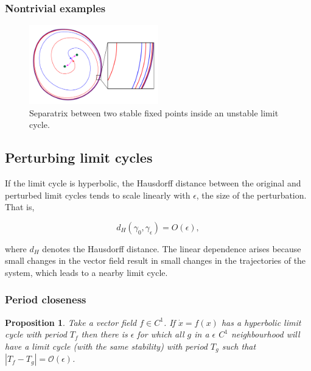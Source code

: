 \documentclass{article}
\newtheorem{proposition}{Proposition}
\theoremstyle{definition}
\theoremstyle{remark}
\newcounter{ct}
\begin{document}
\subsubsection{Nontrivial examples}

\setlength\belowcaptionskip{-5ex}
\begin{figure}
  \centering
  \includegraphics[width=0.5\textwidth]{unstab_lc_3fps}
  \caption{Separatrix between two stable fixed points inside an unstable limit cycle.
  }\label{fig:unstab_lc_3fps}
\end{figure}



\subsection{Perturbing limit cycles}
If the limit cycle is hyperbolic, the Hausdorff distance between the original and perturbed limit cycles tends to scale linearly with \(\epsilon\), the size of the perturbation. That is,

\[
d_H(\gamma_0, \gamma_\epsilon) = O(\epsilon),
\]

where \(d_H\) denotes the Hausdorff distance. The linear dependence arises because small changes in the vector field result in small changes in the trajectories of the system, which leads to a nearby limit cycle.


\subsubsection{Period closeness}\label{sec:periodcloseness}
\begin{proposition}\label{prop:periodcloseness}%
Take a vector field $f\in C^1$.
If $\dot x = f(x)$ has a hyperbolic limit cycle with period $T_f$ then there is $\epsilon$ for which all $g$ in a $\epsilon$ $C^1$ neighbourhood will have a limit cycle (with the same stability) with period $T_g$ such that  $|T_f-T_g| = \mathcal{O}(\epsilon)$.
\end{proposition}
\end{document}
